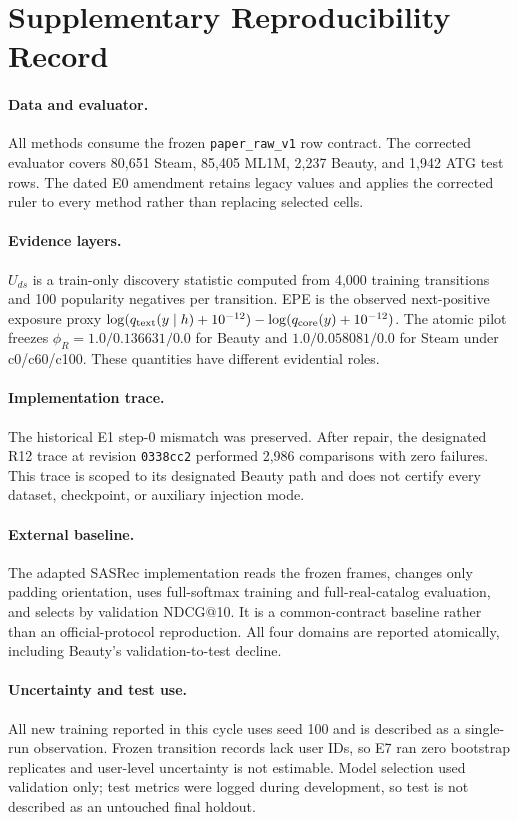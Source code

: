 \section{Supplementary Reproducibility Record}

\paragraph{Data and evaluator.}
All methods consume the frozen \texttt{paper\_raw\_v1} row contract.
The corrected evaluator covers 80,651 Steam, 85,405 ML1M, 2,237 Beauty,
and 1,942 ATG test rows. The dated E0 amendment retains legacy values
and applies the corrected ruler to every method rather than replacing
selected cells.

\paragraph{Evidence layers.}
$U_{ds}$ is a train-only discovery statistic computed from 4,000
training transitions and 100 popularity negatives per transition. EPE
is the observed next-positive exposure proxy
$\log(q_{\rm text}(y\mid h)+10^{-12})-
\log(q_{\rm core}(y)+10^{-12})$. The atomic pilot freezes
$\phi_R=1.0/0.136631/0.0$ for Beauty and
$1.0/0.058081/0.0$ for Steam under c0/c60/c100. These quantities have
different evidential roles.

\paragraph{Implementation trace.}
The historical E1 step-0 mismatch was preserved. After repair, the
designated R12 trace at revision \texttt{0338cc2} performed 2,986
comparisons with zero failures. This trace is scoped to its designated
Beauty path and does not certify every dataset, checkpoint, or auxiliary
injection mode.

\paragraph{External baseline.}
The adapted SASRec implementation reads the frozen frames, changes only
padding orientation, uses full-softmax training and full-real-catalog
evaluation, and selects by validation NDCG@10. It is a common-contract
baseline rather than an official-protocol reproduction. All four
domains are reported atomically, including Beauty's validation-to-test
decline.

\paragraph{Uncertainty and test use.}
All new training reported in this cycle uses seed 100 and is described
as a single-run observation. Frozen transition records lack user IDs,
so E7 ran zero bootstrap replicates and user-level uncertainty is not
estimable. Model selection used validation only; test metrics were
logged during development, so test is not described as an untouched
final holdout.

